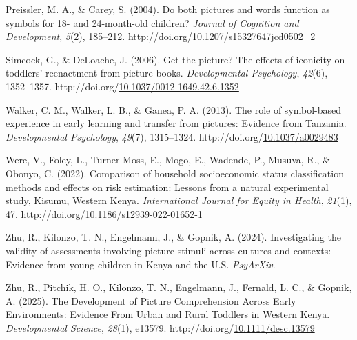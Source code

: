 \documentclass[10pt, letterpaper]{article}
\begin{document}
\begin{CSLReferences}{1}{0}
Preissler, M. A., \& Carey, S. (2004). Do both pictures and words
function as symbols for 18- and 24-month-old children? \emph{Journal of
Cognition and Development}, \emph{5}(2), 185--212.
http://doi.org/\href{https://doi.org/10.1207/s15327647jcd0502_2}{10.1207/s15327647jcd0502\_2}

Simcock, G., \& DeLoache, J. (2006). Get the picture? {The} effects of
iconicity on toddlers' reenactment from picture books.
\emph{Developmental Psychology}, \emph{42}(6), 1352--1357.
http://doi.org/\href{https://doi.org/10.1037/0012-1649.42.6.1352}{10.1037/0012-1649.42.6.1352}

Walker, C. M., Walker, L. B., \& Ganea, P. A. (2013). The role of
symbol-based experience in early learning and transfer from pictures:
{Evidence} from {Tanzania}. \emph{Developmental Psychology},
\emph{49}(7), 1315--1324.
http://doi.org/\href{https://doi.org/10.1037/a0029483}{10.1037/a0029483}

Were, V., Foley, L., Turner-Moss, E., Mogo, E., Wadende, P., Musuva, R.,
\& Obonyo, C. (2022). Comparison of household socioeconomic status
classification methods and effects on risk estimation: Lessons from a
natural experimental study, {Kisumu}, {Western} {Kenya}.
\emph{International Journal for Equity in Health}, \emph{21}(1), 47.
http://doi.org/\href{https://doi.org/10.1186/s12939-022-01652-1}{10.1186/s12939-022-01652-1}

Zhu, R., Kilonzo, T. N., Engelmann, J., \& Gopnik, A. (2024).
Investigating the validity of assessments involving picture stimuli
across cultures and contexts: {Evidence} from young children in {Kenya}
and the {U}.{S}. \emph{PsyArXiv}.

Zhu, R., Pitchik, H. O., Kilonzo, T. N., Engelmann, J., Fernald, L. C.,
\& Gopnik, A. (2025). The {Development} of {Picture} {Comprehension}
{Across} {Early} {Environments}: {Evidence} {From} {Urban} and {Rural}
{Toddlers} in {Western} {Kenya}. \emph{Developmental Science},
\emph{28}(1), e13579.
http://doi.org/\href{https://doi.org/10.1111/desc.13579}{10.1111/desc.13579}

\end{CSLReferences}


\end{document}
